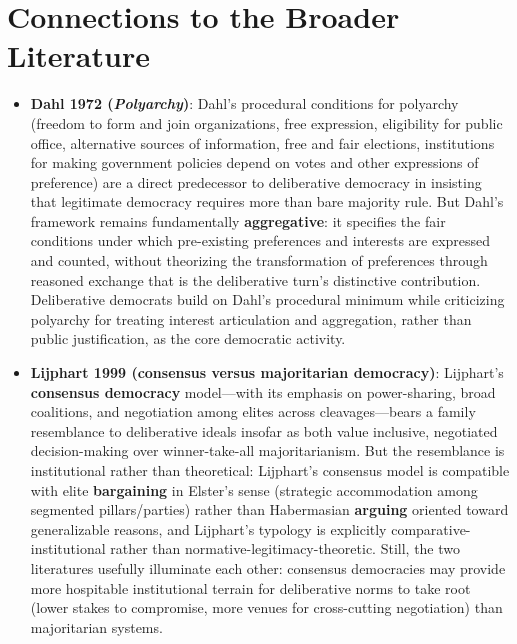 \documentclass[12pt]{article}
\begin{document}
\section{Connections to the Broader Literature}

\begin{itemize}[leftmargin=*, itemsep=4pt]
    \item \textbf{Dahl 1972 (\textit{Polyarchy})}: Dahl's procedural conditions for polyarchy (freedom to form and join organizations, free expression, eligibility for public office, alternative sources of information, free and fair elections, institutions for making government policies depend on votes and other expressions of preference) are a direct predecessor to deliberative democracy in insisting that legitimate democracy requires more than bare majority rule. But Dahl's framework remains fundamentally \textbf{aggregative}: it specifies the fair conditions under which pre-existing preferences and interests are expressed and counted, without theorizing the transformation of preferences through reasoned exchange that is the deliberative turn's distinctive contribution. Deliberative democrats build on Dahl's procedural minimum while criticizing polyarchy for treating interest articulation and aggregation, rather than public justification, as the core democratic activity.
    \item \textbf{Lijphart 1999 (consensus versus majoritarian democracy)}: Lijphart's \textbf{consensus democracy} model---with its emphasis on power-sharing, broad coalitions, and negotiation among elites across cleavages---bears a family resemblance to deliberative ideals insofar as both value inclusive, negotiated decision-making over winner-take-all majoritarianism. But the resemblance is institutional rather than theoretical: Lijphart's consensus model is compatible with elite \textbf{bargaining} in Elster's sense (strategic accommodation among segmented pillars/parties) rather than Habermasian \textbf{arguing} oriented toward generalizable reasons, and Lijphart's typology is explicitly comparative-institutional rather than normative-legitimacy-theoretic. Still, the two literatures usefully illuminate each other: consensus democracies may provide more hospitable institutional terrain for deliberative norms to take root (lower stakes to compromise, more venues for cross-cutting negotiation) than majoritarian systems.

\end{itemize}
\end{document}
